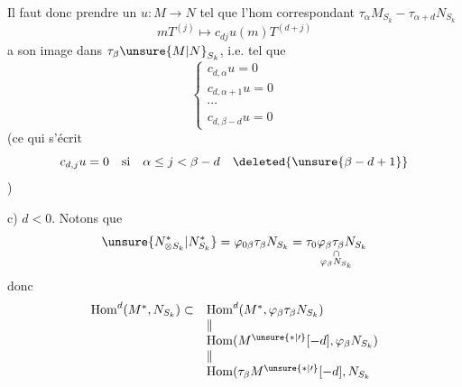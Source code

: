 
Il faut donc prendre un $u:M\longrightarrow N$ tel que l'hom correspondant $\tau_\alpha M_{S_k}-\tau_{\alpha+d}N_{S_k}$
\[
mT^{(j)}\longmapsto c_{dj}u(m)T^{(d+j)}
\]
 a son image dans $\tau_\beta\unsure{M|N}_{S_k}$, i.e. tel que
\[
\left\{\begin{array}{l}
c_{d,\alpha}u=0\\
c_{d,\alpha+1}u=0\\
\cdots\\
c_{d,\beta-d}u=0
\end{array}\right.
\]
(ce qui s'écrit
\[
c_{d,j}u=0\quad\text{si}\quad\alpha\leq j<\beta-d\quad\deleted{\unsure{\beta-d+1}}
\]
)

c) \uline{$d<0$}. Notons que
\[
\unsure{N^*_{\otimes S_k}|N^*_{S_k}}=\varphi_{0\beta}\tau_\beta N_{S_k}=\underset{\substack{\cap\\\varphi_\beta N_{S_k}}}{\tau_0\varphi_\beta\tau_\beta N_{S_k}}
\]
donc 
\[
\begin{array}{ll}
\operatorname{Hom}^d(M^*,N_{S_k})\subset & \operatorname{Hom}^d(M^*,\varphi_\beta\tau_\beta N_{S_k})\\
& \Vert\\
& \operatorname{Hom}(M^{\unsure{*|\prime}}[-d],\varphi_\beta N_{S_k})\\
& \Vert\\
& \operatorname{Hom}(\tau_\beta M^{\unsure{*|\prime}}[-d],N_{S_k}
\end{array}
\]
